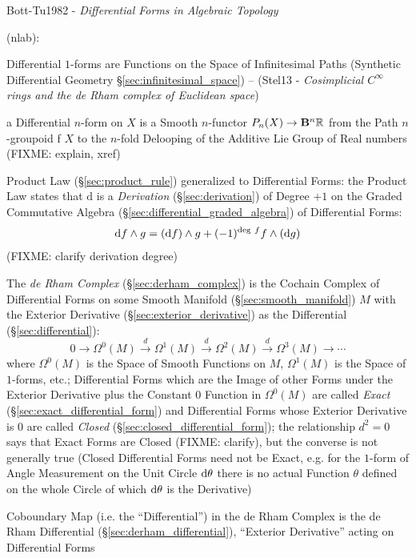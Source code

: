 {Bott-Tu1982 - \emph{Differential Forms in Algebraic Topology}

(nlab):

Differential $1$-forms are Functions on the Space of Infinitesimal Paths
(Synthetic Differential Geometry \S\ref{sec:infinitesimal_space}) -- (Stel13 -
\emph{Cosimplicial $C^\infty$ rings and the de Rham complex of Euclidean space})

a Differential $n$-form on $X$ is a Smooth $n$-functor $P_n(X) \rightarrow
\mathbf{B}^n\mathbb{R}$ from the Path $n$-groupoid f $X$ to the $n$-fold Delooping
of the Additive Lie Group of Real numbers (FIXME: explain, xref)

Product Law (\S\ref{sec:product_rule}) generalized to Differential Forms: the
Product Law states that $\mathrm{d}$ is a \emph{Derivation}
(\S\ref{sec:derivation}) of Degree $+1$ on the Graded Commutative Algebra
(\S\ref{sec:differential_graded_algebra}) of Differential Forms:
\[
\mathrm{d}f \wedge g = (\mathrm{d}f) \wedge g +
  (-1)^{\mathrm{deg}\ f}f \wedge (\mathrm{d}g)
\]
(FIXME: clarify derivation degree)

\asterism

The \emph{de Rham Complex} (\S\ref{sec:derham_complex}) is the Cochain Complex
of Differential Forms on some Smooth Manifold (\S\ref{sec:smooth_manifold}) $M$
with the Exterior Derivative (\S\ref{sec:exterior_derivative}) as the
Differential (\S\ref{sec:differential}):
\[
  0 \rightarrow \Omega^0(M) \xrightarrow{d} \Omega^1(M) \xrightarrow{d}
  \Omega^2(M) \xrightarrow{d} \Omega^3(M) \rightarrow \cdots
\]
where $\Omega^0(M)$ is the Space of Smooth Functions on $M$, $\Omega^1(M)$ is
the Space of $1$-forms, etc.; Differential Forms which are the Image of other
Forms under the Exterior Derivative plus the Constant $0$ Function in
$\Omega^0(M)$ are called \emph{Exact} (\S\ref{sec:exact_differential_form}) and
Differential Forms whose Exterior Derivative is $0$ are called \emph{Closed}
(\S\ref{sec:closed_differential_form}); the relationship $d^2 = 0$ says that
Exact Forms are Closed (FIXME: clarify), but the converse is not generally true
(Closed Differential Forms need not be Exact, e.g. for the $1$-form of Angle
Measurement on the Unit Circle $\mathrm{d}\theta$ there is no actual Function
$\theta$ defined on the whole Circle of which $\mathrm{d}\theta$ is the
Derivative)

Coboundary Map (i.e. the ``Differential'') in the de Rham Complex is the de Rham
Differential (\S\ref{sec:derham_differential}), ``Exterior Derivative'' acting
on Differential Forms

}
